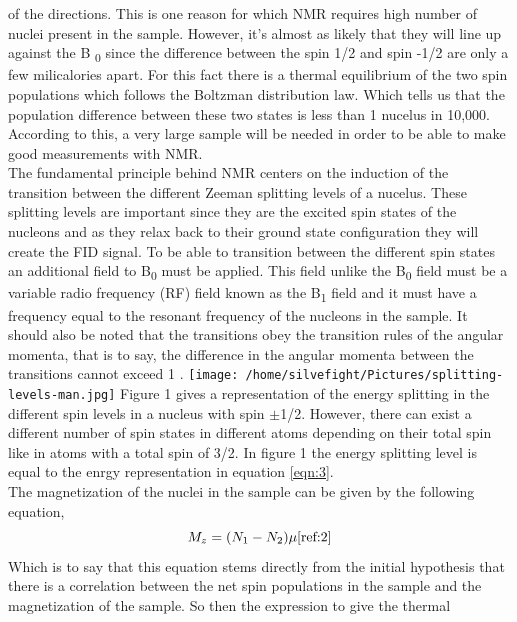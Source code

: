 \documentclass{article}
\begin{document}
{\begin{multicols}{2}
of the directions. This is one reason for which NMR requires high number of 
nuclei present in the sample\cite{ref:1}.
However, it's almost as likely that they will line up against the B
\textsubscript{0} since the difference between the spin 1/2 and spin -1/2 are 
only a few milicalories apart. For this fact there is a thermal equilibrium of 
the two spin populations which follows the Boltzman distribution law. Which 
tells us that the population difference between these two states is less than 
1 nucelus in 10,000. According to this, a very large sample will be needed in 
order to be able to make good measurements with NMR\cite{ref:1}.
\\
The fundamental principle behind NMR centers on the induction of the transition 
between the different Zeeman splitting levels of a nucelus. These splitting 
levels are important since they are the excited spin states of the nucleons and 
as they relax back to their ground state configuration they will create the 
FID signal. To be able to transition between the different spin states an 
additional field to B\textsubscript{0} must be applied. This field unlike the 
B\textsubscript{0} field must be a variable radio frequency (RF) field known as 
the B\textsubscript{1} field and it must have a frequency equal to the resonant 
frequency of the nucleons in the sample. It should also be noted that the 
transitions obey the transition rules of the angular momenta, that is to say, 
the difference in the angular momenta between the transitions cannot exceed 1
\cite{ref:2}.
\center
\texttt{[image: /home/silvefight/Pictures/splitting-levels-man.jpg]}
\label{fig:1}
\justify
Figure 1 gives a representation of the energy splitting in the different spin 
levels in a nucleus with spin $\pm$1/2. However, there can exist a different 
number of spin states in different atoms depending on their total spin like in 
atoms with a total spin of 3/2. In figure 1 the energy splitting level is equal 
to the enrgy representation in equation \ref{eqn:3}.
\\
The magnetization of the nuclei in the sample can be given by the following 
equation,
\begin{equation}
M_z = (N_1-N_2)\mu
\label{eqn:5}
\cite{ref:2}
\end{equation}
Which is to say that this equation stems directly from the initial hypothesis 
that there is a correlation between the net spin populations in the sample and 
the magnetization of the sample. So then the expression to give the thermal 

\end{multicols}}
\end{document}
